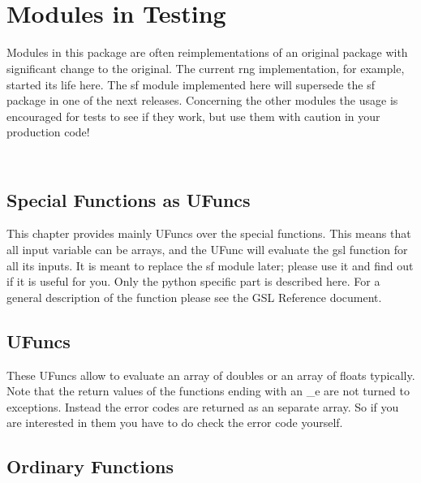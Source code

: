 \chapter[\protect\module{pygsl.testing} ---  Modules in Testing]
{\protect{} \\ Modules in Testing}
\label{cha:statistics-module}


Modules in this package are often reimplementations of an original package
with significant change to the original. The current rng implementation, for
example, started its life here.  The sf module implemented here will supersede
the sf package in one of the next releases. Concerning the other modules the 
usage is encouraged for tests
to see if they work, but use them with caution in your production code!

\section[\protect\module{pygsl.testing.sf} --- Special UFuncs]
{\protect{} \\ Special Functions as UFuncs}


This chapter provides mainly \numpy{} UFuncs over the special functions. This means
that all input variable can be arrays, and the UFunc will evaluate the gsl
function for all its inputs. It is meant to replace the sf module later;
please use it and find out if it is useful for you. 
Only the python specific part is described here. For a general description of
the function please see the GSL Reference document.  

\section{UFuncs}
\label{sec:ufuncs}
These UFuncs allow to evaluate an array of doubles or an array of floats
typically. Note that the return values of the functions ending with an _e are
not turned to exceptions. Instead the error codes are returned as an separate
array. So if you are interested in them you have to do check the error code
yourself. 



\section{Ordinary Functions}


